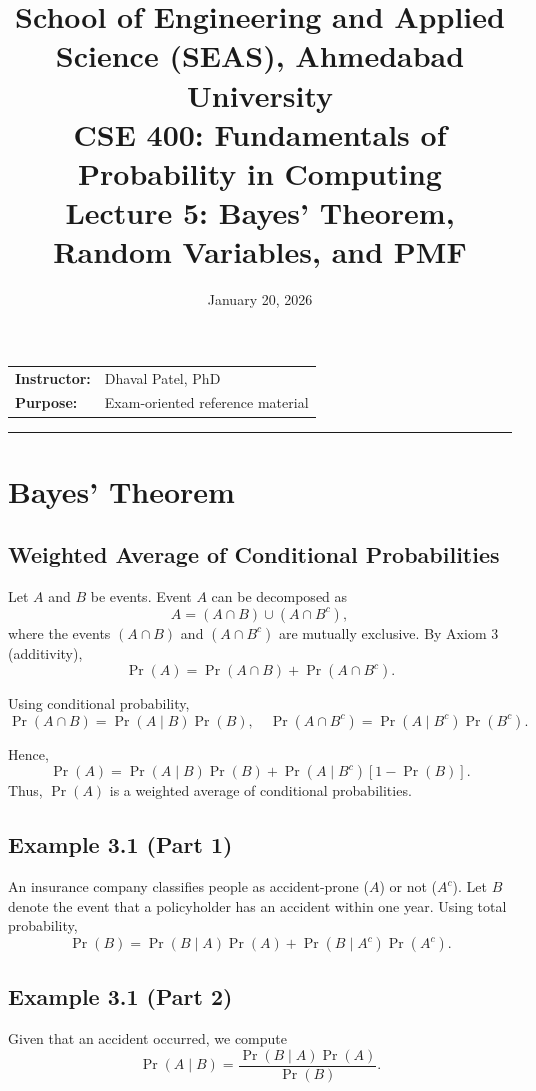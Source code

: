 \documentclass[11pt]{article}
\title{
\normalsize School of Engineering and Applied Science (SEAS), Ahmedabad University\\
\vspace{0.2cm}
\textbf{CSE 400: Fundamentals of Probability in Computing}\\
\Large Lecture 5: Bayes' Theorem, Random Variables, and PMF
}
\author{}
\date{January 20, 2026}
\begin{document}
\maketitle
\vspace{-1.5cm}

\begin{center}
\begin{tabular}{ll}
\textbf{Instructor:} & Dhaval Patel, PhD \\[1ex]
\textbf{Purpose:} & Exam-oriented reference material
\end{tabular}
\end{center}

\hrule
\vspace{0.5cm}


\section{Bayes' Theorem}

\subsection{Weighted Average of Conditional Probabilities}
Let $A$ and $B$ be events. Event $A$ can be decomposed as
\[
A = (A \cap B) \cup (A \cap B^c),
\]
where the events $(A \cap B)$ and $(A \cap B^c)$ are mutually exclusive.  
By Axiom 3 (additivity),
\[
\Pr(A) = \Pr(A \cap B) + \Pr(A \cap B^c).
\]

Using conditional probability,
\[
\Pr(A \cap B) = \Pr(A \mid B)\Pr(B), \quad
\Pr(A \cap B^c) = \Pr(A \mid B^c)\Pr(B^c).
\]

Hence,
\[
\Pr(A) = \Pr(A \mid B)\Pr(B) + \Pr(A \mid B^c)[1 - \Pr(B)].
\]
Thus, $\Pr(A)$ is a weighted average of conditional probabilities.

\subsection{Example 3.1 (Part 1)}
An insurance company classifies people as accident-prone ($A$) or not ($A^c$).  
Let $B$ denote the event that a policyholder has an accident within one year.  
Using total probability,
\[
\Pr(B) = \Pr(B \mid A)\Pr(A) + \Pr(B \mid A^c)\Pr(A^c).
\]

\subsection{Example 3.1 (Part 2)}
Given that an accident occurred, we compute
\[
\Pr(A \mid B) = \frac{\Pr(B \mid A)\Pr(A)}{\Pr(B)}.
\]
\end{document}
